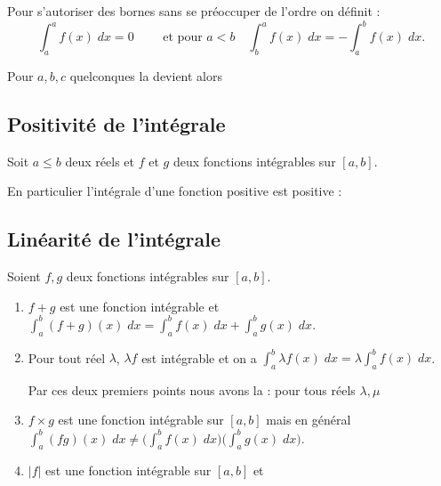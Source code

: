 \documentclass[class=report,crop=false]{standalone}
\begin{document}
Pour s'autoriser des bornes sans se préoccuper de l'ordre on définit :
$$\int_a^a f(x) \;dx=0 \qquad \text{ et pour } a<b  \quad \int_b^a f(x) \;dx= -\int_a^b f(x) \; dx.$$

Pour $a,b,c$ quelconques la  devient alors



\subsection{Positivité de l'intégrale}
\label{ssec:int22}

\begin{proposition}
Soit $a \le b$ deux réels et $f$ et $g$ deux fonctions intégrables sur $[a,b]$.
\end{proposition}

En particulier l'intégrale d'une fonction positive est positive :


\subsection{Linéarité de l'intégrale}
\label{ssec:int23}

\begin{proposition}
Soient $f,g$ deux fonctions intégrables sur $[a,b]$.
\begin{enumerate}
  \item $f+g$ est une fonction intégrable et
$\int_a^b (f+g)(x) \; dx= \int_a^b f(x) \; dx+ \int_a^b g(x) \; dx$.

  \item Pour tout réel $\lambda$,  $\lambda f$ est
intégrable et on a $\int_a^b \lambda f(x) \; dx= \lambda \int_a^b f(x) \; dx$.

Par ces deux premiers points
nous avons la  :
pour tous réels $\lambda,\mu$


  \item $f \times g$ est une fonction intégrable sur $[a,b]$
mais en général $\int_a^b (f g)(x)\;dx \neq
\big(\int_a^b f(x)\;dx\big)\big(\int_a^b g(x)\;dx\big)$.

  \item $|f|$ est une fonction intégrable sur $[a,b]$ et
\end{enumerate}
\end{proposition}
\end{document}
